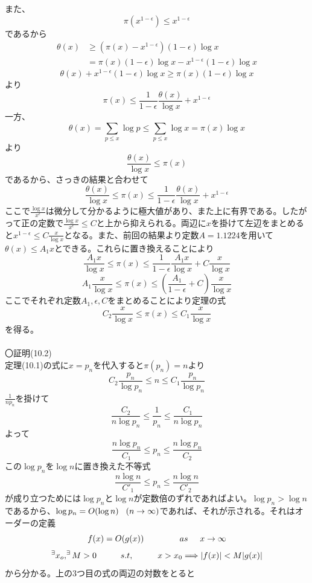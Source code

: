 \documentclass{jsarticle}
\begin{document}
また、
\[\pi(x^{1-\epsilon})\leq x^{1-\epsilon}\]
であるから
\begin{align*}
\theta(x)&\geq\left(\pi(x)-x^{1-\epsilon}\right)(1-\epsilon)\log x\\
&=\pi(x)(1-\epsilon)\log x-x^{1-\epsilon}(1-\epsilon)\log x
\end{align*}
\[\theta(x)+x^{1-\epsilon}(1-\epsilon)\log x\geq\pi(x)(1-\epsilon)\log x\]
より
\[\pi(x)\leq\frac{1}{1-\epsilon}\frac{\theta(x)}{\log x}+x^{1-\epsilon}\]
一方、
\[\theta(x)=\sum_{p\leq x}\log p\leq\sum_{p\leq x}\log x=\pi(x)\log x\]
より
\[\frac{\theta(x)}{\log x}\leq\pi(x)\]
であるから、さっきの結果と合わせて
\[\frac{\theta(x)}{\log x}\leq\pi(x)\leq\frac{1}{1-\epsilon}\frac{\theta(x)}{\log x}+x^{1-\epsilon}\]
ここで\(\frac{\log x}{x^\epsilon}\)は微分して分かるように極大値があり、また上に有界である。したがって正の定数で\(\frac{\log x}{x^{\epsilon}}\leq C\)と上から抑えられる。両辺に\(x\)を掛けて左辺をまとめると\(x^{1-\epsilon}\leq C\frac{x}{\log x}\)となる。また、前回の結果より定数\(A=1.1224\)を用いて\(\theta(x)\leq A_{1}x\)とできる。これらに置き換えることにより
\[\frac{A_{1}x}{\log x}\leq\pi(x)\leq\frac{1}{1-\epsilon}\frac{A_{1}x}{\log x}+C\frac{x}{\log x}\]
\[A_{1}\frac{x}{\log x}\leq\pi(x)\leq\left(\frac{A_{1}}{1-\epsilon}+C\right)\frac{x}{\log x}\]
ここでそれぞれ定数\(A_{1},\epsilon,C\)をまとめることにより定理の式
\[C_{2}\frac{x}{\log x}\leq\pi(x)\leq C_{1}\frac{x}{\log x}\]
を得る。
\\
\\
〇証明(10.2)\\
定理(10.1)の式に\(x=p_{n}\)を代入すると\(\pi(p_{n})=n\)より
\[C_{2}\frac{p_{n}}{\log p_{n}}\leq n\leq C_{1}\frac{p_{n}}{\log p_{n}}\]
\(\frac{1}{np_{n}}\)を掛けて
\[\frac{C_{2}}{n\log p_{n}}\leq\frac{1}{p_{n}}\leq\frac{C_{1}}{n\log p_{n}}\]
よって
\[\frac{n\log p_{n}}{C_{1}}\leq p_{n}\leq\frac{n\log p_{n}}{C_{2}}\]
この\(\log p_{n}\)を\(\log n\)に置き換えた不等式
\[\frac{n\log n}{C'_{1}}\leq p_{n}\leq\frac{n\log n}{C'_{2}}\]
が成り立つためには\(\log p_{n}\)と\(\log n\)が定数倍のずれであればよい。\(\log p_{n}>\log n\)であるから、\(\log p_{n}=O(\log n)\hspace{3mm}(n\to\infty)\)であれば、それが示される。それはオーダーの定義
\[f(x)=O(g(x))\hspace{15mm}as\hspace{5mm}x\to\infty\]
\[^\exists x_{o},^\exists M>0\hspace{10mm}s.t,\hspace{10mm}x>x_{0}\Longrightarrow|f(x)|<M|g(x)|\]
から分かる。上の3つ目の式の両辺の対数をとると
\end{document}

